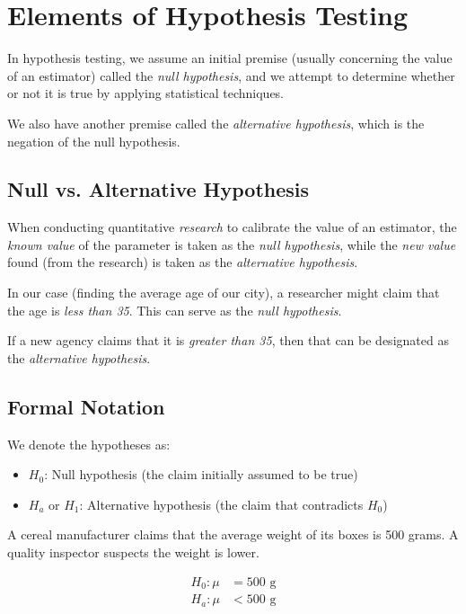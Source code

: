 \section{Elements of Hypothesis Testing}

In hypothesis testing, we assume an initial premise (usually concerning the value of an estimator) called the \emph{null hypothesis}, and we attempt to determine whether or not it is true by applying statistical techniques.

We also have another premise called the \emph{alternative hypothesis}, which is the negation of the null hypothesis.

\subsection{Null vs. Alternative Hypothesis}

When conducting quantitative \emph{research} to calibrate the value of an estimator, the \emph{known value} of the parameter is taken as the \emph{null hypothesis}, while the \emph{new value} found (from the research) is taken as the \emph{alternative hypothesis}.

In our case (finding the average age of our city), a researcher might claim that the age is \emph{less than 35}. This can serve as the \emph{null hypothesis}.

If a new agency claims that it is \emph{greater than 35}, then that can be designated as the \emph{alternative hypothesis}.

\subsection{Formal Notation}

We denote the hypotheses as:
\begin{itemize}
	\item $H_0$: Null hypothesis (the claim initially assumed to be true)
	\item $H_a$ or $H_1$: Alternative hypothesis (the claim that contradicts $H_0$)
\end{itemize}

\begin{ejemplo}
	A cereal manufacturer claims that the average weight of its boxes is 500 grams. A quality inspector suspects the weight is lower.
	
	\begin{align}
		H_0: \mu &= 500 \text{ g} \\
		H_a: \mu &< 500 \text{ g}
	\end{align}
\end{ejemplo}

